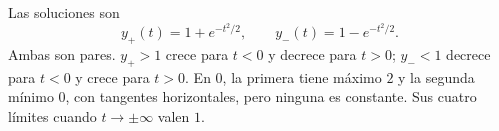 Las soluciones son
\[
y_+(t)=1+e^{-t^2/2},\qquad
 y_-(t)=1-e^{-t^2/2}.
\]
Ambas son pares. \(y_+>1\) crece para \(t<0\) y decrece para \(t>0\); \(y_-<1\) decrece para \(t<0\) y crece para \(t>0\). En \(0\), la primera tiene máximo \(2\) y la segunda mínimo \(0\), con tangentes horizontales, pero ninguna es constante. Sus cuatro límites cuando \(t\to\pm\infty\) valen \(1\).
